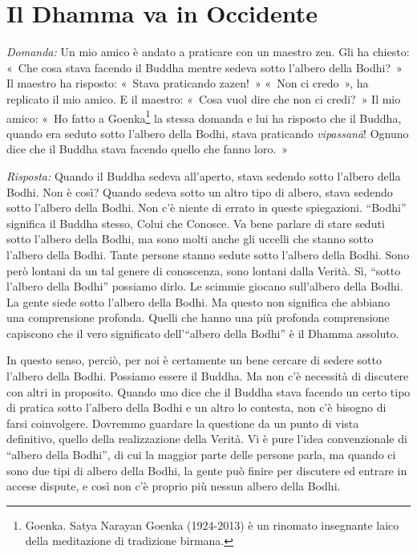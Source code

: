 \chapter{Il Dhamma va in Occidente}

\emph{Domanda:} Un mio amico è andato a praticare con un maestro zen. Gli ha
chiesto: «~Che cosa stava facendo il Buddha mentre sedeva sotto l'albero
della Bodhi?~» Il maestro ha risposto: «~Stava praticando zazen!~» «~Non
ci credo~», ha replicato il mio amico. E il maestro: «~Cosa vuol dire
che non ci credi?~» Il mio amico: «~Ho fatto a Goenka\footnote{Goenka.
  Satya Narayan Goenka (1924-2013) è un rinomato insegnante laico della
  meditazione di tradizione birmana.} la stessa domanda e lui ha
risposto che il Buddha, quando era seduto sotto l'albero della Bodhi,
stava praticando \emph{vipassanā}! Ognuno dice che il Buddha stava
facendo quello che fanno loro.~»

\emph{Risposta:} Quando il Buddha sedeva all'aperto, stava sedendo sotto
l'albero della Bodhi. Non è così? Quando sedeva sotto un altro tipo di
albero, stava sedendo sotto l'albero della Bodhi. Non c'è niente di
errato in queste spiegazioni. ``Bodhi'' significa il Buddha stesso,
Colui che Conosce. Va bene parlare di stare seduti sotto l'albero della
Bodhi, ma sono molti anche gli uccelli che stanno sotto l'albero della
Bodhi. Tante persone stanno sedute sotto l'albero della Bodhi. Sono però
lontani da un tal genere di conoscenza, sono lontani dalla Verità. Sì,
``sotto l'albero della Bodhi'' possiamo dirlo. Le scimmie giocano
sull'albero della Bodhi. La gente siede sotto l'albero della Bodhi. Ma
questo non significa che abbiano una comprensione profonda. Quelli che
hanno una più profonda comprensione capiscono che il vero significato
dell'``albero della Bodhi'' è il Dhamma assoluto.

In questo senso, perciò, per noi è certamente un bene cercare di sedere
sotto l'albero della Bodhi. Possiamo essere il Buddha. Ma non c'è
necessità di discutere con altri in proposito. Quando uno dice che il
Buddha stava facendo un certo tipo di pratica sotto l'albero della Bodhi
e un altro lo contesta, non c'è bisogno di farsi coinvolgere. Dovremmo
guardare la questione da un punto di vista definitivo, quello della
realizzazione della Verità. Vi è pure l'idea convenzionale di ``albero
della Bodhi'', di cui la maggior parte delle persone parla, ma quando ci
sono due tipi di albero della Bodhi, la gente può finire per discutere
ed entrare in accese dispute, e così non c'è proprio più nessun albero
della Bodhi.

